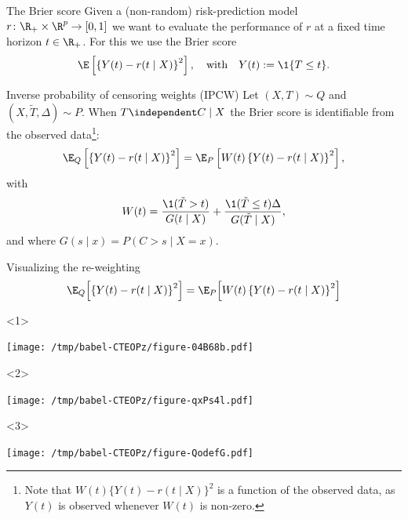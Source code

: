 \documentclass[smaller]{beamer}\usepackage{listings}
\begin{document}
\begin{frame}[label={sec:orgaca5d14}]{The Brier score}
Given a (non-random) risk-prediction model \(r \colon \R_+ \times \R^p \rightarrow [0,1]\) we want
to evaluate the performance of \(r\) at a fixed time horizon \(t \in \R_+\). For this we use the
Brier score
\begin{equation*}
  \E\left[ 
    \left\{
      Y(t) - r(t \mid X)
    \right\}^2 \right],
  \quad \text{with} \quad Y(t):= \1\{T \leq t\}.     
\end{equation*}

\begin{block}{Inverse probability of censoring weights (IPCW)}
Let $(X, T) \sim Q$ and $(X, \tilde T, \Delta) \sim P$. When $T \independent C \mid X$ the
Brier score is identifiable from the observed data\footnote<1->{Note that
  $W(t)\{Y(t)-r(t\mid X)\}^2$ is a function of the observed data, as $Y(t)$ is observed whenever
  $W(t)$ is non-zero.}:
\begin{equation*}
  \E_Q\left[ 
    \left\{
      Y(t) - r(t \mid X)
    \right\}^2 \right]
  = \E_P\left[
    W(t)
    \left\{
      Y(t) - r(t \mid X)
    \right\}^2 \right],
\end{equation*}
with
\begin{equation*}
  W(t) = \frac{\1({\tilde{T} >t})}{G(t \mid X)} + \frac{\1({\tilde{T}\leq
      t})\Delta}{G(\tilde{T}\mid X)},
\end{equation*}
and where $G(s \mid x) = P(C > s \mid X=x)$.
\end{block}
\end{frame}


\begin{frame}[label={sec:org2acd925}]{Visualizing the re-weighting}
\begin{equation*}
  \E_Q{\left[ 
    \left\{
      Y(t) - r(t \mid X)
    \right\}^2 \right]}
  = \E_P{\left[
    W(t)
    \left\{
      Y(t) - r(t \mid X)
    \right\}^2 \right]}
\end{equation*}    

\vfill

\begin{onlyenv}<1>
\begin{center}
\texttt{[image: /tmp/babel-CTEOPz/figure-04B68b.pdf]}
\end{center}
\end{onlyenv}


\begin{onlyenv}<2>
\begin{center}
\texttt{[image: /tmp/babel-CTEOPz/figure-qxPs4l.pdf]}
\end{center}
\end{onlyenv}


\begin{onlyenv}<3>
\begin{center}
\texttt{[image: /tmp/babel-CTEOPz/figure-QodefG.pdf]}
\end{center}
\end{onlyenv}
\end{frame}
\end{document}
